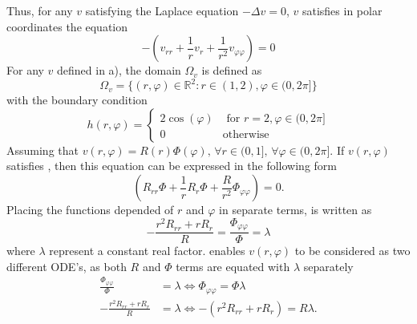 Thus, for any $v$ satisfying the Laplace equation $-\Delta v = 0$, $v$ satisfies in polar coordinates the equation
\begin{equation}
	\label{eq:laplacePolar}
	-\left(v_{rr} + \frac{1}{r} v_r + \frac{1}{r^2} v_{\varphi\varphi}\right)=0
\end{equation}
%
For any $v$ defined in a), the domain $\Omega_v$ is defined as
\begin{equation}
	\Omega_v = \{(r,\varphi) \in \mathbb{R}^2 \colon r \in (1,2), \varphi \in (0, 2\pi]\}
\end{equation}
with the boundary condition 
\begin{equation}
	h(r, \varphi) =
	\begin{cases}
		2\cos{(\varphi)} &\text{ for } r = 2,  \varphi \in (0, 2\pi] \\
		0 &\text{otherwise}
	\end{cases}
\end{equation}
%
\newcommand{\constFac}{\lambda}
Assuming that $v(r,\varphi) = R(r)\Phi(\varphi) \text{, } \forall r \in (0,1] \text{, } \forall \varphi \in (0,2\pi]$.
If $v(r,\varphi)$ satisfies , then this equation can be expressed in the following form
\begin{equation}
	\label{eq:laplaceSep}
	\left(R_{rr} \Phi + \frac{1}{r} R_r \Phi + \frac{R}{r^2} \Phi_{\varphi\varphi}\right) = 0
	\text{.}
\end{equation}
Placing the functions depended of $r$ and $\varphi$ in separate terms,  is written as
\begin{equation}
	\label{eq:laplaceSep2}
	-\frac{r^2 R_{rr} + r R_r}{R} = \frac{\Phi_{\varphi\varphi}}{\Phi} = \constFac
\end{equation}
where $\constFac$ represent a constant real factor.
 enables $v(r,\varphi)$ to be considered as two different ODE's, as both $R$ and $\Phi$ terms are equated with $\constFac$ separately
%
\begin{align}
	\frac{\Phi_{\varphi\varphi}}{\Phi} &= \constFac \iff    \Phi_{\varphi\varphi} = \Phi \constFac \\ 
	-\frac{r^2 R_{rr} + r R_r}{R} &= \constFac      \iff   -\left(r^2 R_{rr} + r R_r \right) = R \constFac
	\text{.}
\end{align}
%

%
%

%

%
